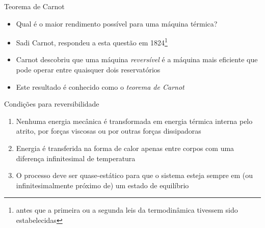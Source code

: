 \documentclass[t,%
brazilian,%
11pt,%
aspectratio=169,%
table%
]{beamer}
\begin{document}
\begin{frame}{Teorema de Carnot}
    \begin{itemize}
        \item Qual é o maior rendimento possível para uma máquina térmica?
        \item Sadi Carnot, respondeu a esta questão em 1824\footnote{antes que a
                primeira ou a segunda leis da termodinâmica tivessem sido
                estabelecidas}
            \item Carnot descobriu que uma máquina \textit{reversível} é a
                máquina mais eficiente que pode operar entre quaisquer dois
                reservatórios
            \item Este resultado é conhecido como o \textit{teorema de Carnot}
    \end{itemize}

    \begin{block}{Condições para reversibilidade}
        \begin{enumerate}
            \item Nenhuma energia mecânica é transformada em energia térmica
                interna pelo atrito, por forças viscosas ou por outras forças
                dissipadoras
            \item Energia é transferida na forma de calor apenas entre corpos
                com uma diferença infinitesimal de temperatura
            \item O processo deve ser quase-estático para que o sistema esteja
                sempre em (ou infinitesimalmente próximo de) um estado de
                equilíbrio
        \end{enumerate}
    \end{block}
\end{frame}
\end{document}

